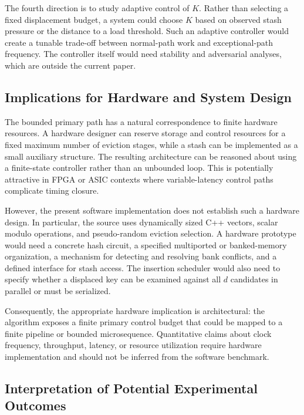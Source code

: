\documentclass[conference]{IEEEtran}
\begin{document}
The fourth direction is to study adaptive control of $K$. Rather than selecting
a fixed displacement budget, a system could choose $K$ based on observed stash
pressure or the distance to a load threshold. Such an adaptive controller
would create a tunable trade-off between normal-path work and exceptional-path
frequency. The controller itself would need stability and adversarial analyses,
which are outside the current paper.

\subsection{Implications for Hardware and System Design}
\label{subsec:discussion_hardware}

The bounded primary path has a natural correspondence to finite hardware
resources. A hardware designer can reserve storage and control resources for a
fixed maximum number of eviction stages, while a stash can be implemented as
a small auxiliary structure. The resulting architecture can be reasoned about
using a finite-state controller rather than an unbounded loop. This is
potentially attractive in FPGA or ASIC contexts where variable-latency control
paths complicate timing closure.

However, the present software implementation does not establish such a
hardware design. In particular, the source uses dynamically sized C++ vectors,
scalar modulo operations, and pseudo-random eviction selection. A hardware
prototype would need a concrete hash circuit, a specified multiported or
banked-memory organization, a mechanism for detecting and resolving bank
conflicts, and a defined interface for stash access. The insertion scheduler
would also need to specify whether a displaced key can be examined against all
$d$ candidates in parallel or must be serialized.

Consequently, the appropriate hardware implication is architectural: the
algorithm exposes a finite primary control budget that could be mapped to a
finite pipeline or bounded microsequence. Quantitative claims about clock
frequency, throughput, latency, or resource utilization require hardware
implementation and should not be inferred from the software benchmark.

\subsection{Interpretation of Potential Experimental Outcomes}
\label{subsec:discussion_outcomes}
\end{document}
